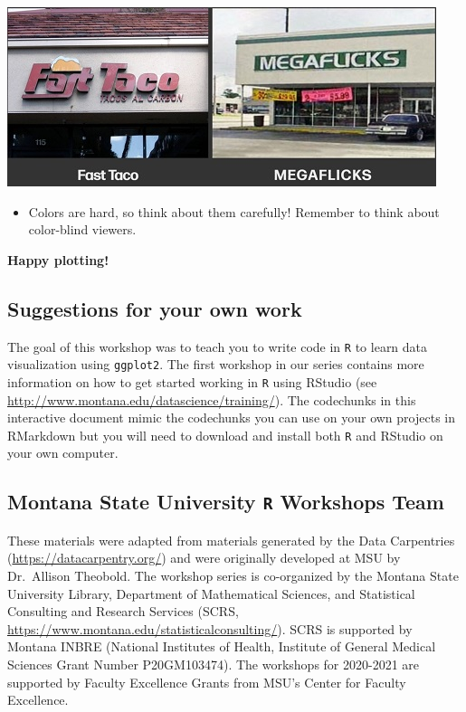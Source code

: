 \documentclass[
]{article}
\providecommand{\tightlist}{%
  \setlength{\itemsep}{0pt}\setlength{\parskip}{0pt}}
\begin{document}
\includegraphics{images/fonts.JPG}

\begin{itemize}
\tightlist
\item
  Colors are hard, so think about them carefully! Remember to think
  about color-blind viewers.
\end{itemize}

\textbf{Happy plotting!}

\hypertarget{suggestions-for-your-own-work}{%
\subsection{Suggestions for your own
work}\label{suggestions-for-your-own-work}}

The goal of this workshop was to teach you to write code in \texttt{R}
to learn data visualization using \texttt{ggplot2}. The first workshop
in our series contains more information on how to get started working in
\texttt{R} using RStudio (see
\url{http://www.montana.edu/datascience/training/}). The codechunks in
this interactive document mimic the codechunks you can use on your own
projects in RMarkdown but you will need to download and install both
\texttt{R} and RStudio on your own computer.

\hypertarget{montana-state-university-r-workshops-team}{%
\subsection{\texorpdfstring{Montana State University \texttt{R}
Workshops
Team}{Montana State University R Workshops Team}}\label{montana-state-university-r-workshops-team}}

These materials were adapted from materials generated by the Data
Carpentries (\url{https://datacarpentry.org/}) and were originally
developed at MSU by Dr.~Allison Theobold. The workshop series is
co-organized by the Montana State University Library, Department of
Mathematical Sciences, and Statistical Consulting and Research Services
(SCRS, \url{https://www.montana.edu/statisticalconsulting/}). SCRS is
supported by Montana INBRE (National Institutes of Health, Institute of
General Medical Sciences Grant Number P20GM103474). The workshops for
2020-2021 are supported by Faculty Excellence Grants from MSU's Center
for Faculty Excellence.
\end{document}
